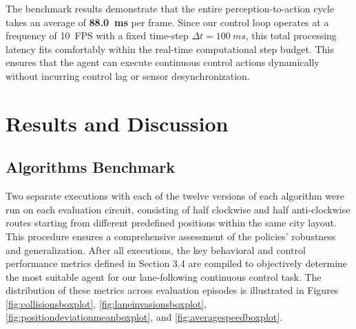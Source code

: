 \documentclass[sn-mathphys,Numbered]{sn-jnl}
\begin{document}
The benchmark results demonstrate that the entire perception-to-action cycle takes an average of \textbf{\SI{88.0}{ms}} per frame. Since our control loop operates at a frequency of \SI{10}{FPS} with a fixed time-step $\Delta t = \SI{100}{ms}$, this total processing latency fits comfortably within the real-time computational step budget. This ensures that the agent can execute continuous control actions dynamically without incurring control lag or sensor desynchronization.

\section{Results and Discussion}

\subsection{Algorithms Benchmark}
\label{sec:algorithms_benchmark}

Two separate executions with each of the twelve versions of each algorithm were run on each evaluation circuit, consisting of half clockwise and half anti-clockwise routes starting from different predefined positions within the same city layout. This procedure ensures a comprehensive assessment of the policies' robustness and generalization. After all executions, the key behavioral and control performance metrics defined in Section 3.4 are compiled to objectively determine the most suitable agent for our lane-following continuous control task. The distribution of these metrics across evaluation episodes is illustrated in Figures \ref{fig:collisionsboxplot}, \ref{fig:laneinvasionsboxplot}, \ref{fig:positiondeviationmeanboxplot}, and \ref{fig:averagespeedboxplot}.
\end{document}

